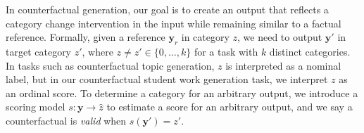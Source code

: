 \documentclass[11pt]{article}
\newcommand{\ml}[1]{\textcolor{orange}{\bf [lan: #1]}}
\newcommand{\al}[1]{\textcolor{blue}{\bf [Alex: #1]}}
\begin{document}
In counterfactual generation, our goal is to create an output that reflects a category change intervention in the input while remaining similar to a factual reference. Formally, given a reference $\mathbf{y}_r$ in category $z$, we need to output $\mathbf{y}'$ in target category $z'$, where $z \neq z' \in \{0,\dots ,k\}$ for a task with $k$ distinct categories. 
In tasks such as counterfactual topic generation, $z$ is interpreted as a nominal label, but in our counterfactual student work generation task, we interpret $z$ as an ordinal score. To determine a category for an arbitrary output, we introduce a scoring model $s: \mathbf{y} \rightarrow \hat{z}$ to estimate a score for an arbitrary output, and we say a counterfactual is \emph{valid} when $s(\mathbf{y}')=z'$.






\end{document}
